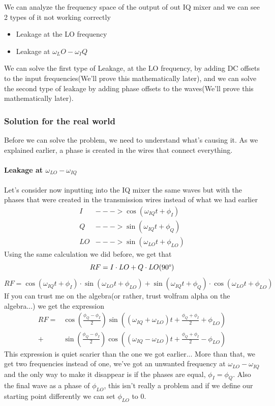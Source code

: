 \documentclass[english, a4paper, 12pt, twoside]{article}
\numberwithin{equation}{section} %
\begin{document}
We can analyze the frequency space of the output of out IQ mixer and we can see 2 types of it not working correctly
\begin{itemize}
  \item Leakage at the LO frequency
  \item Leakage at \(\omega_LO - \omega_IQ\)
\end{itemize}
We can solve the first type of Leakage, at the LO frequency, by adding DC offsets to the input frequencies(We'll prove this mathematically later), and we can solve the second type of leakage by adding phase offsets to the waves(We'll prove this mathematically later).
\subsubsection{Solution for the real world} \label{sec:solution_real_world}
Before we can solve the problem, we need to understand what's causing it. As we explained earlier, a phase  is created  in the wires that connect everything.
\paragraph*{Leakage at \(\omega_{LO} - \omega_{IQ}\) }
Let's consider now inputting into the IQ mixer the same waves but with the phases that were created in the transmission wires instead of what we had earlier
\begin{align*}
    I &---> \cos(\omega_{IQ} t + \phi_I) \\%
    Q &---> \sin(\omega_{IQ} t + \phi_Q) \\%
    LO &---> \sin(\omega_{LO}t + \phi_{LO})
\end{align*}
Using the same calculation we did before, we get that
$$RF = I\cdot LO + Q\cdot LO(90\degree)$$
\[
RF = \cos(\omega_{IQ} t + \phi_I) \cdot \sin(\omega_{LO}t + \phi_{LO}) + \sin(\omega_{IQ} t + \phi_Q) \cdot \cos(\omega_{LO}t + \phi_{LO}) 
\]
If you can trust me on the algebra(or rather, trust wolfram alpha on the algebra...) we get the expression
\begin{align*}
RF = &\cos(\frac{\phi_Q - \phi_I}{2})\sin((\omega_{IQ} + \omega_{LO})t + \frac{\phi_Q + \phi_I}{2} + \phi_{LO}) \\
   + &\sin(\frac{\phi_Q - \phi_I}{2})\cos((\omega_{IQ} - \omega_{LO})t + \frac{\phi_Q + \phi_I}{2} - \phi_{LO})
\end{align*}
This expression is quiet scarier than the one we got earlier... More than that, we get two frequencies instead of one, we've got an unwanted frequency at \(\omega_{LO} - \omega_{IQ}\) and the only way to make it disappear is if the phases are equal, \(\phi_I = \phi_Q\). Also the final wave as a phase of \(\phi_{LO}\), this isn't really a problem and if we define our starting point differently we can set  \(\phi_{LO}\) to 0.
\end{document}
